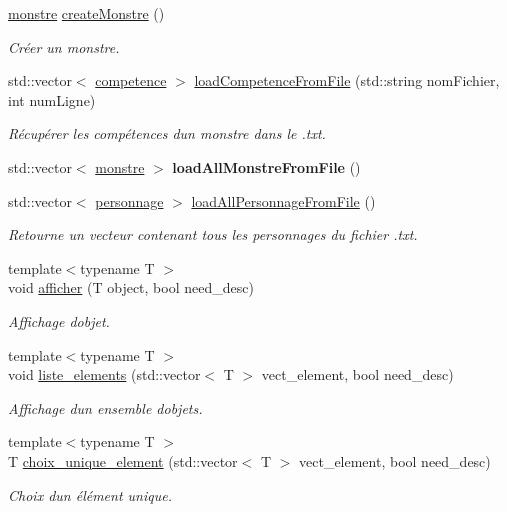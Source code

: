 \begin{DoxyCompactItemize}
\hyperlink{classmonstre}{monstre} \hyperlink{namespaceio_ad3711fbbc414b4d27c255ad8347d3ca2}{create\+Monstre} ()
\begin{DoxyCompactList}\small\item\em Créer un monstre. \end{DoxyCompactList}\item 
\mbox{\label{namespaceio_a9297653474b9ce9930d6a3862401e751}} 
std\+::vector$<$ \hyperlink{classcompetence}{competence} $>$ \hyperlink{namespaceio_a9297653474b9ce9930d6a3862401e751}{load\+Competence\+From\+File} (std\+::string nom\+Fichier, int num\+Ligne)
\begin{DoxyCompactList}\small\item\em Récupérer les compétences d\textquotesingle{}un monstre dans le .txt. \end{DoxyCompactList}\item 
\mbox{\label{namespaceio_a8c8b67b2b523523ab9a6b087fd0c8af8}} 
std\+::vector$<$ \hyperlink{classmonstre}{monstre} $>$ {\bfseries load\+All\+Monstre\+From\+File} ()
\item 
\mbox{\label{namespaceio_a6150bb979919d3984ab243d61a0cc956}} 
std\+::vector$<$ \hyperlink{classpersonnage}{personnage} $>$ \hyperlink{namespaceio_a6150bb979919d3984ab243d61a0cc956}{load\+All\+Personnage\+From\+File} ()
\begin{DoxyCompactList}\small\item\em Retourne un vecteur contenant tous les personnages du fichier .txt. \end{DoxyCompactList}\item 
{\footnotesize template$<$typename T $>$ }\\void \hyperlink{namespaceio_a0e3593d732c42572e8b3cb09ad21c4c9}{afficher} (T object, bool need\+\_\+desc)
\begin{DoxyCompactList}\small\item\em Affichage d\textquotesingle{}objet. \end{DoxyCompactList}\item 
{\footnotesize template$<$typename T $>$ }\\void \hyperlink{namespaceio_a0518bc32f1debefc2630431cd0c22cb0}{liste\+\_\+elements} (std\+::vector$<$ T $>$ vect\+\_\+element, bool need\+\_\+desc)
\begin{DoxyCompactList}\small\item\em Affichage d\textquotesingle{}un ensemble d\textquotesingle{}objets. \end{DoxyCompactList}\item 
{\footnotesize template$<$typename T $>$ }\\T \hyperlink{namespaceio_af398625b832f98bc758b9ea7665a168e}{choix\+\_\+unique\+\_\+element} (std\+::vector$<$ T $>$ vect\+\_\+element, bool need\+\_\+desc)
\begin{DoxyCompactList}\small\item\em Choix d\textquotesingle{}un élément unique. \end{DoxyCompactList}\end{DoxyCompactItemize}


